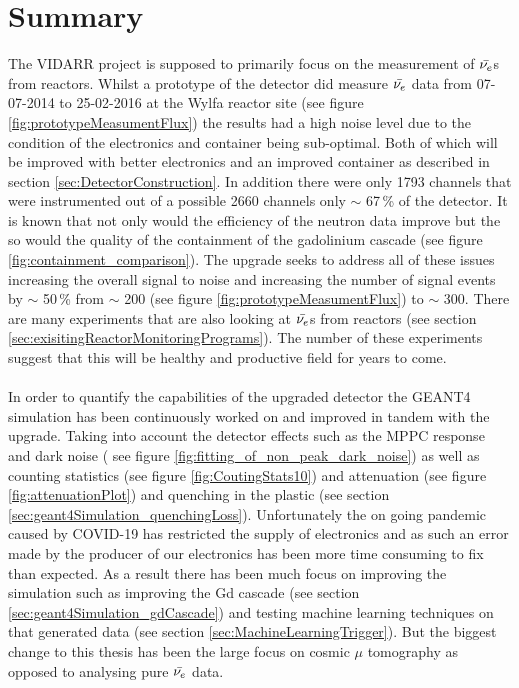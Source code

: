 
\chapter{Summary}

\ifpdf
    \graphicspath{{Chapter6/Figs/Raster/}{Chapter6/Figs/PDF/}{Chapter6/Figs/}}
\else
    \graphicspath{{Chapter6/Figs/Vector/}{Chapter6/Figs/}}
\fi

The VIDARR project is supposed to primarily focus on the measurement of $\Bar{\nu_e}$s from reactors. Whilst a prototype of the detector did measure $\Bar{\nu_e}$ data from 07-07-2014 to 25-02-2016 at the Wylfa reactor site (see figure \ref{fig:prototypeMeasumentFlux}) the results had a high noise level due to the condition of the electronics and container being sub-optimal. Both of which will be improved with better electronics and an improved container as described in section \ref{sec:DetectorConstruction}. In addition there were only 1793 channels that were instrumented out of a possible 2660 channels only $\sim$ 67\,\% of the detector. It is known that not only would the efficiency of the neutron data improve but the so would the quality of the containment of the gadolinium cascade (see figure \ref{fig:containment_comparison}). The upgrade seeks to address all of these issues increasing the overall signal to noise and increasing the number of signal events by $\sim$ 50\,\% from $\sim$ 200 (see figure \ref{fig:prototypeMeasumentFlux}) to $\sim$ 300. There are many experiments that are also looking at $\Bar{\nu_e}$s from reactors (see section \ref{sec:exisitingReactorMonitoringPrograms}). The number of these experiments suggest that this will be healthy and productive field for years to come. 
\\\\In order to quantify the capabilities of the upgraded detector the GEANT4 simulation has been continuously worked on and improved in tandem with the upgrade. Taking into account the detector effects such as the MPPC response and dark noise ( see figure \ref{fig:fitting_of_non_peak_dark_noise}) as well as counting statistics (see figure \ref{fig:CoutingStats10}) and attenuation (see figure \ref{fig:attenuationPlot}) and quenching in the plastic (see section \ref{sec:geant4Simulation_quenchingLoss}). Unfortunately the on going pandemic caused by COVID-19 has restricted the supply of electronics and as such an error made by the producer of our electronics has been more time consuming to fix than expected. As a result there has been much focus on improving the simulation such as improving the Gd cascade (see section \ref{sec:geant4Simulation_gdCascade}) and testing machine learning techniques on that generated data (see section \ref{sec:MachineLearningTrigger}). But the biggest change to this thesis has been the large focus on cosmic $\mu$ tomography as opposed to analysing pure $\Bar{\nu_e}$ data.

